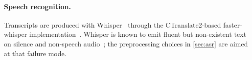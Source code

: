 \paragraph{Speech recognition.}
Transcripts are produced with Whisper~\citep{radford2023whisper} through the
CTranslate2-based faster-whisper implementation~\citep{fasterwhisper}. Whisper
is known to emit fluent but non-existent text on silence and non-speech
audio~\citep{koenecke2024careless}; the preprocessing choices
in \cref{sec:asr} are aimed at that failure mode.
